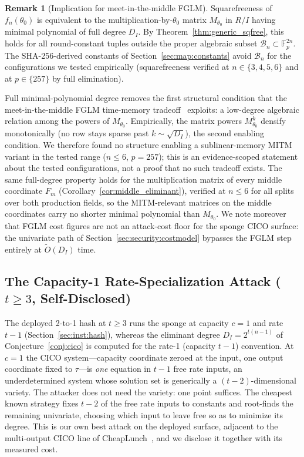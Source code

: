 \documentclass[11pt,a4paper]{article}
\theoremstyle{definition}
\newtheorem{remark}[theorem]{Remark}
\newcommand{\Fp}{\mathbb{F}_p}
\begin{document}
\begin{remark}[Implication for meet-in-the-middle FGLM]\label{rem:mitm_fglm}
Squarefreeness of $f_n(\theta_0)$ is equivalent to the
multiplication-by-$\theta_0$ matrix $M_{\theta_0}$ in $R/I$ having
minimal polynomial of full degree $D_I$. By
Theorem~\ref{thm:generic_sqfree}, this holds for all round-constant
tuples outside the proper algebraic subset
$\mathcal{B}_n\subset\Fp^{2n}$. The SHA-256-derived constants of
Section~\ref{sec:map:constants} avoid $\mathcal{B}_n$ for the
configurations we tested empirically (squarefreeness verified at
$n\in\{3,4,5,6\}$ and at $p\in\{257\}$ by full elimination).

Full minimal-polynomial degree removes the first structural condition
that the meet-in-the-middle FGLM time-memory
tradeoff~\cite{FaugereMou2017} exploits: a low-degree algebraic
relation among the powers of $M_{\theta_0}$. Empirically, the matrix
powers $M_{\theta_0}^k$ densify monotonically (no row stays sparse
past $k\sim\sqrt{D_I}$), the second enabling condition. We therefore
found no structure enabling a sublinear-memory MITM variant in the
tested range ($n \le 6$, $p = 257$); this is an evidence-scoped
statement about the tested configurations, not a proof that no such
tradeoff exists. The same full-degree property holds for the
multiplication matrix of every middle coordinate $F_m$
(Corollary~\ref{cor:middle_eliminant}), verified at $n \le 6$ for all
splits over both production fields, so the MITM-relevant matrices on
the middle coordinates carry no shorter minimal polynomial than
$M_{\theta_0}$. We note moreover that FGLM cost figures are not an
attack-cost floor for the sponge CICO surface: the univariate path of
Section~\ref{sec:security:costmodel} bypasses the FGLM step entirely
at $\widetilde{O}(D_I)$ time.
\end{remark}


\subsection{The Capacity-1 Rate-Specialization Attack ($t \ge 3$, Self-Disclosed)}\label{sec:security:specialization}

The deployed 2-to-1 hash at $t \ge 3$ runs the sponge at capacity
$c = 1$ and rate $t - 1$ (Section~\ref{sec:inst:hash}), whereas the
eliminant degree $D_I = 2^{t(n-1)}$ of
Conjecture~\ref{conj:cico} is computed for the rate-1
(capacity $t-1$) convention. At $c = 1$ the CICO system---capacity
coordinate zeroed at the input, one output coordinate fixed to
$\tau$---is \emph{one} equation in $t - 1$ free rate inputs, an
underdetermined system whose solution set is generically a
$(t-2)$-dimensional variety. The attacker does not need the variety:
one point suffices. The cheapest known strategy fixes $t - 2$ of the
free rate inputs to constants and root-finds the remaining
univariate, choosing which input to leave free so as to minimize its
degree. This is our own best attack on the deployed surface, adjacent
to the multi-output CICO line of CheapLunch~\cite{CheapLunch}, and we
disclose it together with its measured cost.
\end{document}
